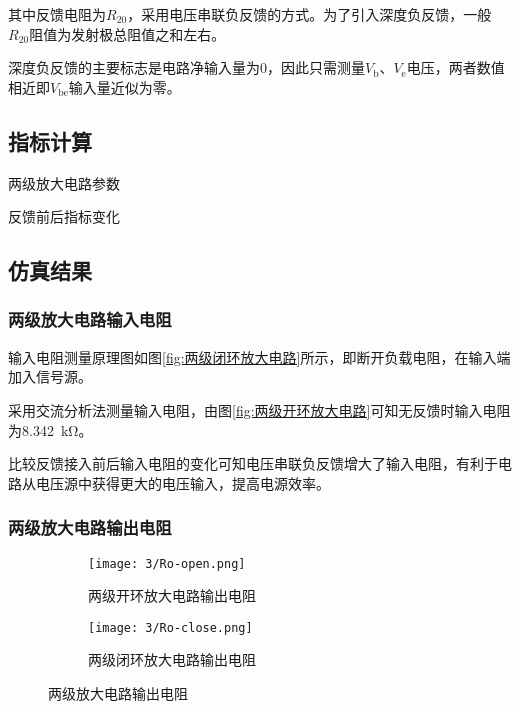 其中反馈电阻为$ R_{20} $，采用电压串联负反馈的方式。为了引入深度负反馈，一般$ R_{20} $阻值为发射极总阻值之和左右。

深度负反馈的主要标志是电路净输入量为0，因此只需测量$ V_\mathrm{b} $、$ V_\mathrm{e} $电压，两者数值相近即$ V_\mathrm{be} $输入量近似为零。

\subsection{指标计算}%
\label{sub:\arabic{chapter}指标计算}

\begin{table}[H]
	\centering
	\caption{两级放大电路参数}
	\label{tab:两级放大电路参数}
\end{table}

\begin{table}[H]
	\centering
	\caption{反馈前后指标变化}
	\label{tab:反馈前后指标变化}
\end{table}

\subsection{仿真结果}%
\label{sub:\arabic{chapter}仿真结果}

\subsubsection{两级放大电路输入电阻}%
\label{ssub:两级放大电路输入电阻}

输入电阻测量原理图如图\ref{fig:两级闭环放大电路}所示，即断开负载电阻，在输入端加入信号源。

采用交流分析法测量输入电阻，由图\ref{fig:两级开环放大电路}可知无反馈时输入电阻为\SI{8.342}{\kohm}。

比较反馈接入前后输入电阻的变化可知电压串联负反馈增大了输入电阻，有利于电路从电压源中获得更大的电压输入，提高电源效率。

\subsubsection{两级放大电路输出电阻}%
\label{ssub:两级放大电路输出电阻}

\begin{figure}[H]
	\centering
	\begin{subfigure}[H]{.7\linewidth}
		\centering
		\texttt{[image: 3/Ro-open.png]}
		\caption{两级开环放大电路输出电阻}
		\label{fig:两级开环放大电路输出电阻}
	\end{subfigure}
	\quad
	\begin{subfigure}[H]{.7\linewidth}
		\centering
		\texttt{[image: 3/Ro-close.png]}
		\caption{两级闭环放大电路输出电阻}
		\label{fig:两级闭环放大电路输出电阻}
	\end{subfigure}
	\caption{两级放大电路输出电阻}
	\label{fig:两级放大电路输出电阻}
\end{figure}

